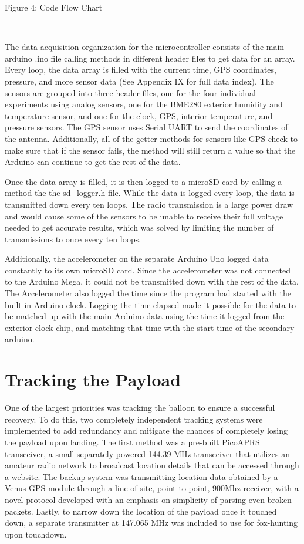 \documentclass[12pt,]{article}
\begin{document}
Figure 4: Code Flow Chart

~

The data acquisition organization for the microcontroller consists of
the main arduino .ino file calling methods in different header files to
get data for an array. Every loop, the data array is filled with the
current time, GPS coordinates, pressure, and more sensor data (See
Appendix IX for full data index). The sensors are grouped into three
header files, one for the four individual experiments using analog
sensors, one for the BME280 exterior humidity and temperature sensor,
and one for the clock, GPS, interior temperature, and pressure sensors.
The GPS sensor uses Serial UART to send the coordinates of the antenna.
Additionally, all of the getter methods for sensors like GPS check to
make sure that if the sensor fails, the method will still return a value
so that the Arduino can continue to get the rest of the data.

Once the data array is filled, it is then logged to a microSD card by
calling a method the the sd\_logger.h file. While the data is logged
every loop, the data is transmitted down every ten loops. The radio
transmission is a large power draw and would cause some of the sensors
to be unable to receive their full voltage needed to get accurate
results, which was solved by limiting the number of transmissions to
once every ten loops.

Additionally, the accelerometer on the separate Arduino Uno logged data
constantly to its own microSD card. Since the accelerometer was not
connected to the Arduino Mega, it could not be transmitted down with the
rest of the data. The Accelerometer also logged the time since the
program had started with the built in Arduino clock. Logging the time
elapsed made it possible for the data to be matched up with the main
Arduino data using the time it logged from the exterior clock chip, and
matching that time with the start time of the secondary arduino.

\section{Tracking the Payload}\label{tracking-the-payload}

One of the largest priorities was tracking the balloon to ensure a
successful recovery. To do this, two completely independent tracking
systems were implemented to add redundancy and mitigate the chances of
completely losing the payload upon landing. The first method was a
pre-built PicoAPRS transceiver, a small separately powered 144.39 MHz
transceiver that utilizes an amateur radio network to broadcast location
details that can be accessed through a website. The backup system was
transmitting location data obtained by a Venus GPS module through a
line-of-site, point to point, 900Mhz receiver, with a novel protocol
developed with an emphasis on simplicity of parsing even broken packets.
Lastly, to narrow down the location of the payload once it touched down,
a separate transmitter at 147.065 MHz was included to use for
fox-hunting upon touchdown.
\end{document}
